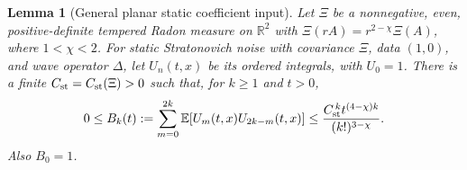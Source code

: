 \documentclass[12pt]{article}
\numberwithin{equation}{section}
\newtheorem{lemma}[theorem]{Lemma}
\theoremstyle{definition}
\newcommand{\R}{\mathbb{R}}
\newcommand{\E}{\mathbb{E}}
\begin{document}
\begin{lemma}[General planar static coefficient input]
  \label{L:planar-static-input}
  Let $\Xi$ be a nonnegative, even, positive-definite tempered Radon
  measure on $\R^2$ with
  $\Xi(rA)=r^{2-\chi}\Xi(A)$, where $1<\chi<2$.
  For static Stratonovich noise with covariance $\Xi$, data $(1,0)$,
  and wave operator $\Delta$, let $U_n(t,x)$ be its ordered integrals,
  with $U_0=1$. There is a finite $C_{\rm st}=C_{\rm st}(\Xi)>0$ such
  that, for $k\ge1$ and $t>0$,
  \begin{equation}\label{E:planar-static-input}
    0\le B_k(t):=\sum_{m=0}^{2k}\E[U_m(t,x)U_{2k-m}(t,x)]
    \le\frac{C_{\rm st}^{\,k}t^{(4-\chi)k}}{(k!)^{3-\chi}}.
  \end{equation}
  Also $B_0=1$.
\end{lemma}
\end{document}
